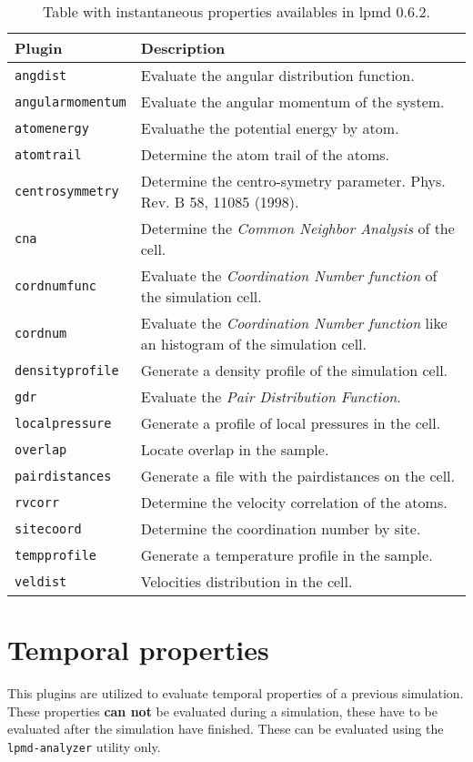 \begin{table}[h!]\centering
 \begin{tabular}{|l|p{13cm}|}\hline
 Plugin & Description \\
 \hline
 \texttt{angdist} & Evaluate the angular distribution function.\\
 \hline
 \texttt{angularmomentum} & Evaluate the angular momentum of the system.\\
 \hline
 \texttt{atomenergy} & Evaluathe the potential energy by atom.\\
 \hline
 \texttt{atomtrail} & Determine the atom trail of the atoms.\\
 \hline
 \texttt{centrosymmetry} & Determine the centro-symetry parameter. Phys. Rev. B
 58, 11085 (1998).\\
 \texttt{cna} & Determine the \textit{Common Neighbor Analysis} of the cell.\\
 \hline
 \texttt{cordnumfunc} & Evaluate the \textit{Coordination Number function} of
 the simulation cell.\\
 \hline
 \texttt{cordnum} & Evaluate the \textit{Coordination Number function} like an
 histogram of the simulation cell.\\
 \hline
 \texttt{densityprofile} & Generate a density profile of the simulation cell.\\
 \hline
 \texttt{gdr} & Evaluate the \textit{Pair Distribution Function}.\\
 \hline
 \texttt{localpressure} & Generate a profile of local pressures in the cell.\\
 \hline
 \texttt{overlap} & Locate overlap in the sample.\\
 \hline
 \texttt{pairdistances} & Generate a file with the pairdistances on the cell.\\
 \hline
 \texttt{rvcorr} & Determine the velocity correlation of the atoms.\\
 \hline
 \texttt{sitecoord} & Determine the coordination number by site.\\
 \hline
 \texttt{tempprofile} & Generate a temperature profile in the sample.\\
 \hline
 \texttt{veldist} & Velocities distribution in the cell.\\
 \hline
 \end{tabular}
\label{tab:modproper}
\caption{Table with instantaneous properties availables in lpmd 0.6.2.}
\end{table}

\section{Temporal properties}
This plugins are utilized to evaluate temporal properties of a previous
simulation. These properties \textbf{can not} be evaluated during a simulation,
these have to be evaluated after the simulation have finished. These can be
evaluated using the \verb|lpmd-analyzer| utility only.

